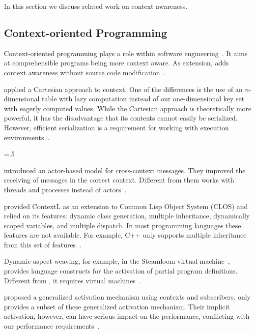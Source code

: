 In this section we discuss related work on context awareness.


\subsection{Context-oriented Programming}

Context-oriented programming plays a role within software engineering~\cite{baldauf2007survey,hong2009context,salvaneschi2012context}.
It aims at comprehensible programs being more context aware.
As extension, \elektra{} adds context awareness without source code modification~\cite{raab2016unanticipated}.

\citet{plaice2010contextcartesian} applied a Cartesian approach to context.
One of the differences is the use of an $n$-dimensional table with lazy computation instead of our one-dimensional key set with eagerly computed values.
While the Cartesian approach is theoretically more powerful, it has the disadvantage that its contents cannot easily be serialized.
However, efficient serialization is a requirement for working with execution environments~\cite{raab2014program}.%
{\parfillskip=0pt \emergencystretch=.5\textwidth \par}

\citet{watanabe2014reflective} introduced an actor-based model for cross-context messages.
They improved the receiving of messages in the correct context.
Different from them \elektra{} works with threads and processes instead of actors~\cite{raab2015global}.


\citet{costanza2006efficientlayeractivation} provided ContextL as an extension to Common Lisp Object System (CLOS) and relied on its features: dynamic class generation, multiple inheritance, dynamically scoped variables, and multiple dispatch.
In most programming languages these features are not available.
For example, C++ only supports multiple inheritance from this set of features~\cite{raab2014program}.

Dynamic aspect weaving, for example, in the Steamloom virtual machine~\cite{bockisch2004steamloom}, provides language constructs for the activation of partial program definitions.
Different from \elektra{}, it requires virtual machines~\cite{raab2014program}.

\citet{kamina2015generalized} proposed a generalized activation mechanism using contexts and subscribers.
\elektra{} only provides a subset of these generalized activation mechanism.
Their implicit activation, however, can have serious impact on the performance, conflicting with our performance requirements~\cite{raab2016persistent}.

